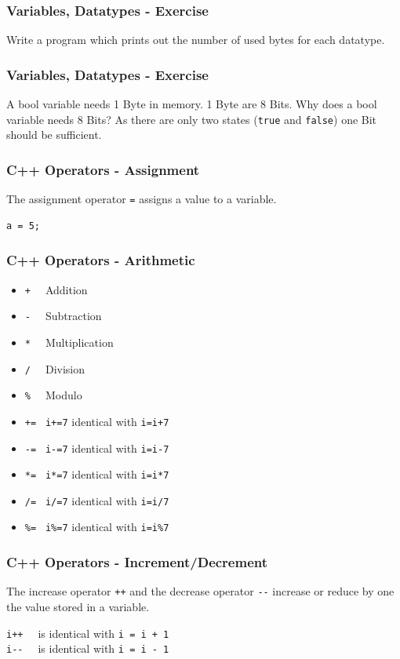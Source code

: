 \begin{frame}[fragile]
  \frametitle{Variables, Datatypes - Exercise}
  \begin{exercise}
  Write a program which prints out the number of used bytes for each datatype.
  \end{exercise}
\end{frame}

\begin{frame}[fragile]
  \frametitle{Variables, Datatypes - Exercise}
  \begin{exercise}
  A bool variable needs 1 Byte in memory. 1 Byte are 8 Bits. Why does a bool
  variable needs 8 Bits? As there are only two states (\verb|true| and \verb|false|) one Bit
  should be sufficient.
  \end{exercise}
\end{frame}

\begin{frame}[fragile]
	\frametitle{C++ Operators - Assignment}
	The assignment operator \verb|=| assigns a value to a variable.

	\vspace{3mm}

\begin{lstlisting}
a = 5;
\end{lstlisting}
\end{frame}

\begin{frame}[fragile]
	\frametitle{C++ Operators - Arithmetic}
	\begin{itemize}
	\item \verb|+  | Addition
	\item \verb|-  | Subtraction
	\item \verb|*  | Multiplication
	\item \verb|/  | Division
	\item \verb|%  | Modulo
	\item \verb|+= | \verb|i+=7| identical with \verb|i=i+7|
	\item \verb|-= | \verb|i-=7| identical with \verb|i=i-7|
	\item \verb|*= | \verb|i*=7| identical with \verb|i=i*7|
	\item \verb|/= | \verb|i/=7| identical with \verb|i=i/7|
	\item \verb|%= | \verb|i%=7| identical with \verb|i=i%7|
	\end{itemize}
\end{frame}

\begin{frame}[fragile]
	\frametitle{C++ Operators - Increment/Decrement}
	The increase operator \verb|++| and the decrease operator \verb|--| increase or
reduce by one the value stored in a variable.

	\vspace{5mm}

	\verb|i++  | is identical with \verb|i = i + 1|\\
	\verb|i--  | is identical with \verb|i = i - 1|
\end{frame}

